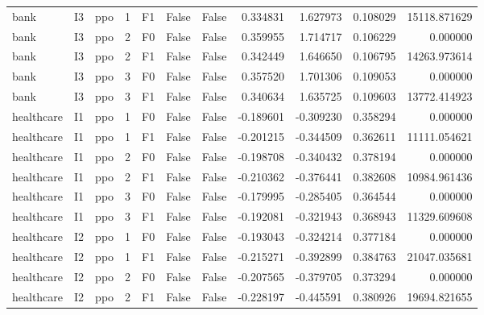 \begin{tabular}{lllrlllrrrr}
      bank &      I3 &       ppo &     1 &  F1 &           False &            False &  0.334831 &  1.627973 & 0.108029 &     15118.871629 \\
      bank &      I3 &       ppo &     2 &  F0 &           False &            False &  0.359955 &  1.714717 & 0.106229 &         0.000000 \\
      bank &      I3 &       ppo &     2 &  F1 &           False &            False &  0.342449 &  1.646650 & 0.106795 &     14263.973614 \\
      bank &      I3 &       ppo &     3 &  F0 &           False &            False &  0.357520 &  1.701306 & 0.109053 &         0.000000 \\
      bank &      I3 &       ppo &     3 &  F1 &           False &            False &  0.340634 &  1.635725 & 0.109603 &     13772.414923 \\
healthcare &      I1 &       ppo &     1 &  F0 &           False &            False & -0.189601 & -0.309230 & 0.358294 &         0.000000 \\
healthcare &      I1 &       ppo &     1 &  F1 &           False &            False & -0.201215 & -0.344509 & 0.362611 &     11111.054621 \\
healthcare &      I1 &       ppo &     2 &  F0 &           False &            False & -0.198708 & -0.340432 & 0.378194 &         0.000000 \\
healthcare &      I1 &       ppo &     2 &  F1 &           False &            False & -0.210362 & -0.376441 & 0.382608 &     10984.961436 \\
healthcare &      I1 &       ppo &     3 &  F0 &           False &            False & -0.179995 & -0.285405 & 0.364544 &         0.000000 \\
healthcare &      I1 &       ppo &     3 &  F1 &           False &            False & -0.192081 & -0.321943 & 0.368943 &     11329.609608 \\
healthcare &      I2 &       ppo &     1 &  F0 &           False &            False & -0.193043 & -0.324214 & 0.377184 &         0.000000 \\
healthcare &      I2 &       ppo &     1 &  F1 &           False &            False & -0.215271 & -0.392899 & 0.384763 &     21047.035681 \\
healthcare &      I2 &       ppo &     2 &  F0 &           False &            False & -0.207565 & -0.379705 & 0.373294 &         0.000000 \\
healthcare &      I2 &       ppo &     2 &  F1 &           False &            False & -0.228197 & -0.445591 & 0.380926 &     19694.821655 \\

\end{tabular}
